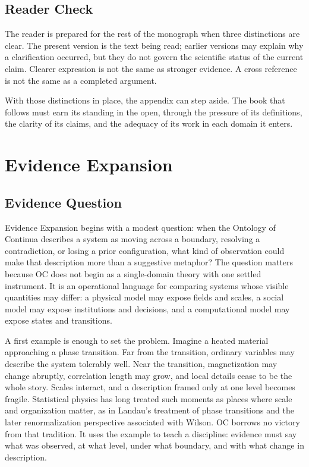 \documentclass[11pt,a4paper,openany]{book}
\begin{document}
\subsection{Reader Check}
The reader is prepared for the rest of the monograph when three distinctions are clear. The present version is the text being read; earlier versions may explain why a clarification occurred, but they do not govern the scientific status of the current claim. Clearer expression is not the same as stronger evidence. A cross reference is not the same as a completed argument. \cite{grimmett_percolation,goldenfeld_lectures}\par
With those distinctions in place, the appendix can step aside. The book that follows must earn its standing in the open, through the pressure of its definitions, the clarity of its claims, and the adequacy of its work in each domain it enters.\par
\section{Evidence Expansion}
\subsection{Evidence Question}
Evidence Expansion begins with a modest question: when the Ontology of Continua describes a system as moving across a boundary, resolving a contradiction, or losing a prior configuration, what kind of observation could make that description more than a suggestive metaphor? The question matters because OC does not begin as a single-domain theory with one settled instrument. It is an operational language for comparing systems whose visible quantities may differ: a physical model may expose fields and scales, a social model may expose institutions and decisions, and a computational model may expose states and transitions. \cite{goldenfeld_lectures,kadanoff_scaling}\par
A first example is enough to set the problem. Imagine a heated material approaching a phase transition. Far from the transition, ordinary variables may describe the system tolerably well. Near the transition, magnetization may change abruptly, correlation length may grow, and local details cease to be the whole story. Scales interact, and a description framed only at one level becomes fragile. Statistical physics has long treated such moments as places where scale and organization matter, as in Landau's treatment of phase transitions and the later renormalization perspective associated with Wilson. OC borrows no victory from that tradition. It uses the example to teach a discipline: evidence must say what was observed, at what level, under what boundary, and with what change in description.\par
\end{document}

